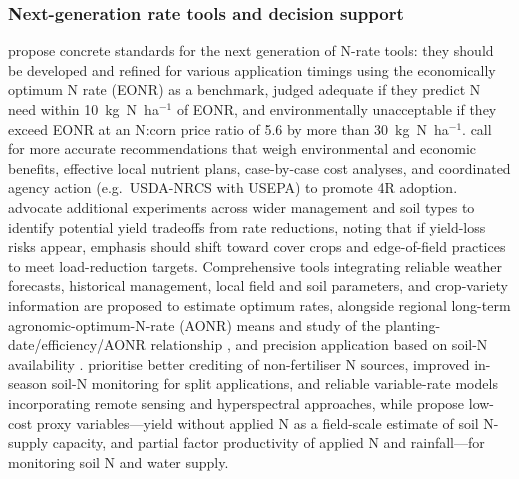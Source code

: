 \documentclass[11pt]{article}
\begin{document}
\subsubsection{Next-generation rate tools and decision support}

\textcite{Bandura2025} propose concrete standards for the next generation of N-rate tools: they should be developed and refined for various application timings using the economically optimum N rate (EONR) as a benchmark, judged adequate if they predict N need within 10~kg~N~ha$^{-1}$ of EONR, and environmentally unacceptable if they exceed EONR at an N:corn price ratio of 5.6 by more than 30~kg~N~ha$^{-1}$. \textcite{Liu2021} call for more accurate recommendations that weigh environmental and economic benefits, effective local nutrient plans, case-by-case cost analyses, and coordinated agency action (e.g.\ USDA-NRCS with USEPA) to promote 4R adoption. \textcite{Banger2018} advocate additional experiments across wider management and soil types to identify potential yield tradeoffs from rate reductions, noting that if yield-loss risks appear, emphasis should shift toward cover crops and edge-of-field practices to meet load-reduction targets. Comprehensive tools integrating reliable weather forecasts, historical management, local field and soil parameters, and crop-variety information are proposed to estimate optimum rates, alongside regional long-term agronomic-optimum-N-rate (AONR) means and study of the planting-date/efficiency/AONR relationship \parencite{Maas2022}, and precision application based on soil-N availability \parencite{Gupta2023}. \textcite{Dinnes2002} prioritise better crediting of non-fertiliser N sources, improved in-season soil-N monitoring for split applications, and reliable variable-rate models incorporating remote sensing and hyperspectral approaches, while \textcite{Cassman2025} propose low-cost proxy variables---yield without applied N as a field-scale estimate of soil N-supply capacity, and partial factor productivity of applied N and rainfall---for monitoring soil N and water supply.
\end{document}
